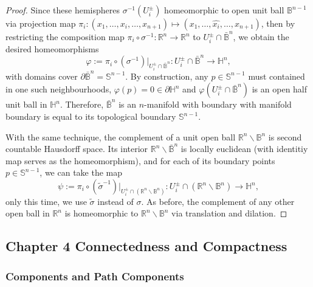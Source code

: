 \documentclass[a4paper]{article}
\theoremstyle{remark}
\newcommand{\rn}{\mathbb{R}^n} %
\newcommand{\hn}{\mathbb{H}^n} %
\newcommand{\s}{\mathbb{S}} %
\newcommand{\openball}{\mathbb{B}} %
\newcommand{\closedball}{\bar{\mathbb{B}}} %
\newcommand{\doo}{\partial}    %
\begin{document}
\begin{proof}
	
	
	Since these hemispheres $\sigma^{-1}(U^{\pm}_i)$ homeomorphic to open unit ball $\openball^{n-1}$ via projection map $\pi_i : (x_1,\dots,x_i,\dots,x_{n+1}) \mapsto (x_1,\dots,\hat{x_i},\dots,x_{n+1})$, then by restricting the composition map $\pi_i \circ \sigma^{-1} : \rn \to \rn$ to $U_i^{\pm} \cap \closedball^n$, we obtain the desired homeomorphisms
	$$
	\varphi:=\pi_i \circ (\sigma^{-1})|_{U_i^{\pm}\cap \closedball^n} : U_i^{\pm}\cap \closedball^n \to \hn, 
	$$
	with domains cover $\doo \closedball^n = \s^{n-1}$. By construction, any $p\in \s^{n-1}$ must contained in one such neighbourhoods,  $\varphi(p)=0 \in \doo \hn$ and $\varphi(U_i^{\pm}\cap \closedball^n)$ is an open half unit ball in $\hn$. Therefore, $\closedball^n$ is an $n$-manifold with boundary with manifold boundary is equal to its topological boundary $\s^{n-1}$.
	
	With the same technique, the complement of a unit open ball $\rn \smallsetminus \openball^n$ is second countable Hausdorff space. Its interior $\rn \smallsetminus \closedball^n$ is locally euclidean (with identitiy map serves as the homeomorphism), and for each of its boundary points $p \in \s^{n-1}$, we can take the map 
	$$
	\psi:= \pi_i \circ (\tilde{\sigma}^{-1})|_{U_i^{\pm} \cap (\rn \smallsetminus \openball^n)} : U_i^{\pm} \cap (\rn \smallsetminus \openball^n) \to \hn,
	$$
	only this time, we use $\tilde{\sigma}$ instead of $\sigma$. As before, the complement of any other open ball in $\rn$ is homeomorphic to $\rn \smallsetminus \openball^n$ via translation and dilation.
\end{proof}

\subsection*{Chapter 4 Connectedness and Compactness}

\subsubsection*{Components and Path Components}
\end{document}
